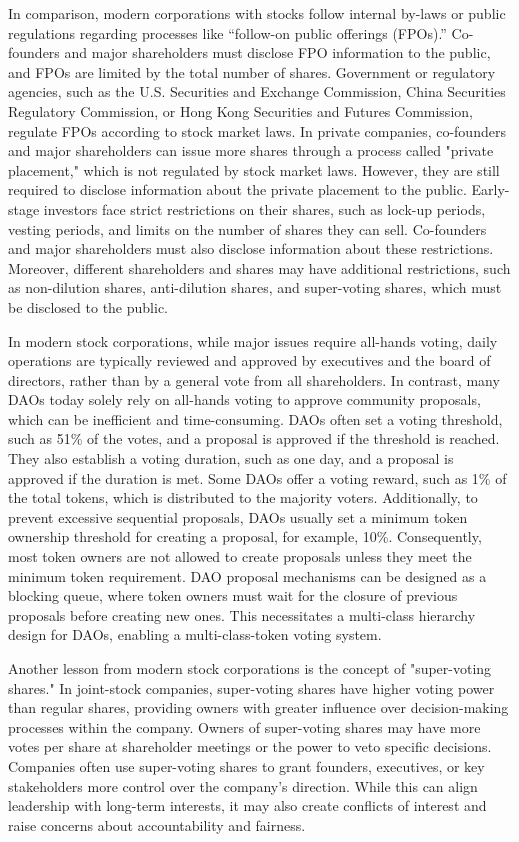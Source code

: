 \documentclass[main.tex]{subfiles}
\begin{document}
In comparison, modern corporations with stocks follow internal by-laws or public regulations regarding processes like ``follow-on public offerings (FPOs).'' Co-founders and major shareholders must disclose FPO information to the public, and FPOs are limited by the total number of shares. Government or regulatory agencies, such as the U.S. Securities and Exchange Commission, China Securities Regulatory Commission, or Hong Kong Securities and Futures Commission, regulate FPOs according to stock market laws. In private companies, co-founders and major shareholders can issue more shares through a process called "private placement," which is not regulated by stock market laws. However, they are still required to disclose information about the private placement to the public. Early-stage investors face strict restrictions on their shares, such as lock-up periods, vesting periods, and limits on the number of shares they can sell. Co-founders and major shareholders must also disclose information about these restrictions. Moreover, different shareholders and shares may have additional restrictions, such as non-dilution shares, anti-dilution shares, and super-voting shares, which must be disclosed to the public.

In modern stock corporations, while major issues require all-hands voting, daily operations are typically reviewed and approved by executives and the board of directors, rather than by a general vote from all shareholders. In contrast, many DAOs today solely rely on all-hands voting to approve community proposals, which can be inefficient and time-consuming. DAOs often set a voting threshold, such as 51\% of the votes, and a proposal is approved if the threshold is reached. They also establish a voting duration, such as one day, and a proposal is approved if the duration is met. Some DAOs offer a voting reward, such as 1\% of the total tokens, which is distributed to the majority voters. Additionally, to prevent excessive sequential proposals, DAOs usually set a minimum token ownership threshold for creating a proposal, for example, 10\%. Consequently, most token owners are not allowed to create proposals unless they meet the minimum token requirement. DAO proposal mechanisms can be designed as a blocking queue, where token owners must wait for the closure of previous proposals before creating new ones. This necessitates a multi-class hierarchy design for DAOs, enabling a multi-class-token voting system.

Another lesson from modern stock corporations is the concept of "super-voting shares." In joint-stock companies, super-voting shares have higher voting power than regular shares, providing owners with greater influence over decision-making processes within the company. Owners of super-voting shares may have more votes per share at shareholder meetings or the power to veto specific decisions. Companies often use super-voting shares to grant founders, executives, or key stakeholders more control over the company's direction. While this can align leadership with long-term interests, it may also create conflicts of interest and raise concerns about accountability and fairness.
\end{document}
